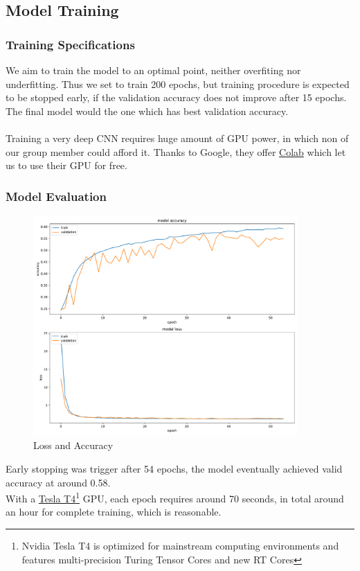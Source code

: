 \documentclass[11pt,a4paper]{article}
\begin{document}
    \subsection{Model Training}
    \subsubsection{Training Specifications}
    We aim to train the model to an optimal point, neither overfiting nor underfitting. Thus we set to train 200 epochs, but training procedure is expected to be stopped early, if the validation accuracy does not improve after 15 epochs. The final model would the one which has best validation accuracy. \\
    \\
    Training a very deep CNN requires huge amount of GPU power, in which non of our group member could afford it. Thanks to Google, they offer \href{https://research.google.com/colaboratory/}{Colab} which let us to use their GPU for free.
    
    \subsubsection{Model Evaluation}
    \begin{figure}[H]
        \centering
        \includegraphics[width = 0.9\textwidth]{emotion_detection/plot/history.pdf}
        \caption{Loss and Accuracy}
        \label{fig:loss_acc}
    \end{figure}
    Early stopping was trigger after 54 epochs, the model eventually achieved valid accuracy at around 0.58. \\
    With a \href{https://www.nvidia.com/en-us/data-center/tesla-t4/}{Tesla T4}\footnote{Nvidia Tesla T4 is optimized for mainstream computing environments and features multi-precision Turing Tensor Cores and new RT Cores} GPU, each epoch requires around 70 seconds, in total around an hour for complete training, which is reasonable.
    
\end{document}
